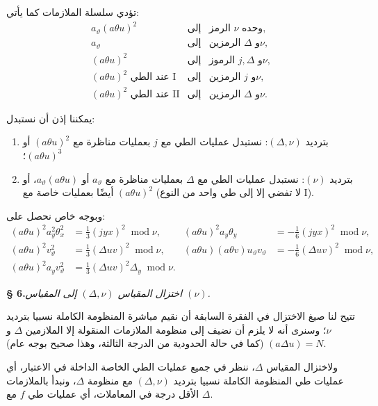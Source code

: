\documentclass[11pt]{article}
\providecommand{\modu}[1]{\;\operatorname{mod} #1}
\begin{document}
تؤدي سلسلة الملازمات كما يأتي:
\[
\begin{array}{rcl}
a_\vartheta(a\theta u)^2 &\text{إلى}& \text{الرمز }\nu\text{ وحده},\\[0.2em]
a_\vartheta &\text{إلى}& \text{الرمزين }\Delta\text{ و}\nu,\\[0.2em]
(a\theta u)^2 &\text{إلى}& \text{الرموز }j,\Delta\text{ و}\nu,\\[0.2em]
(a\theta u)^2\text{ عند الطي I} &\text{إلى}& \text{الرمزين }j\text{ و}\nu,\\[0.2em]
(a\theta u)^2\text{ عند الطي II} &\text{إلى}& \text{الرمزين }\Delta\text{ و}\nu.
\end{array}
\]

يمكننا إذن أن نستبدل:
\begingroup
\renewcommand{\labelenumi}{\arabic{enumi})}
\begin{enumerate}
\item بترديد $(\Delta,\nu)$: نستبدل عمليات الطي مع $j$ بعمليات مناظرة مع $(a\theta u)^2$ أو $(a\theta u)^3$؛
\item بترديد $(\nu)$: نستبدل عمليات الطي مع $\Delta$ بعمليات مناظرة مع $a_\vartheta$ أو $a_\vartheta(a\theta u)$، أو أيضًا بعمليات خاصة مع $(a\theta u)^2$ (لا تفضي إلا إلى طي واحد من النوع I).
\end{enumerate}
\endgroup
وبوجه خاص نحصل على:
\[
\begin{aligned}
(a\theta u)^2a_y^2\theta_x^2&=\frac13(jyx)^2\modu{\nu},&
(a\theta u)^2a_y\theta_y&=-\frac16(jyx)^2\modu{\nu},\\[0.4em]
(a\theta u)^2v_\vartheta^2&=\frac13(\Delta uv)^2\modu{\nu},&
(a\theta u)(a\theta v)u_\vartheta v_\vartheta&=-\frac16(\Delta uv)^2\modu{\nu},\\[0.4em]
(a\theta u)^2a_yv_\vartheta^2&=\frac13(\Delta uv)^2\Delta_y\modu{\nu}.
\end{aligned}
\]

\begin{center}
\textbf{§ 6.}\quad\emph{اختزال المقياس $(\Delta,\nu)$ إلى المقياس $(\nu)$.}
\end{center}

تتيح لنا صيغ الاختزال في الفقرة السابقة أن نقيم مباشرة المنظومة الكاملة نسبيا بترديد $\nu$؛ وسنرى أنه لا يلزم أن نضيف إلى منظومة الملازمات المنقولة إلا الملازمين $\Delta$ و$(a\Delta u)=N$ (كما في حالة الحدودية من الدرجة الثالثة، وهذا صحيح بوجه عام).

ولاختزال المقياس $\Delta$، ننظر في جميع عمليات الطي الخاصة الداخلة في الاعتبار، أي عمليات طي المنظومة الكاملة نسبيا بترديد $(\Delta,\nu)$ مع منظومة $\Delta$، ونبدأ بالملازمات الأقل درجة في المعاملات، أي عمليات طي $f$ مع $\Delta$.
\end{document}
